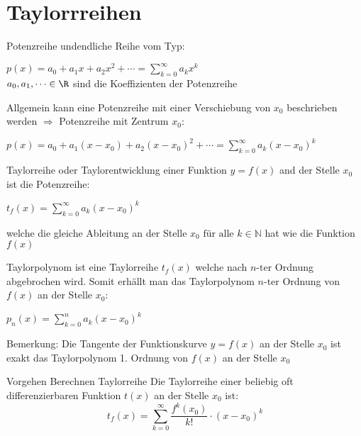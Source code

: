 \raggedcolumns


\section{Taylorrreihen}

\begin{definition}{Potenzreihe} undendliche Reihe vom Typ:
    \begin{center}
    $p(x)=a_0+a_1x+a_2x^2+ \cdots = \sum_{k=0}^{\infty}{a_kx^k} $\\
    \vspace{2mm}
    \(a_0,a_1, \cdots \in \R\) sind die Koeffizienten der Potenzreihe
    \end{center}
    Allgemein kann eine Potenzreihe mit einer Verschiebung von \(x_0\) beschrieben werden $\Rightarrow$ Potenzreihe mit Zentrum \(x_0\):
    \begin{center}
    $p(x)=a_0+a_1(x-x_0)+a_2(x-x_0)^2+\cdots = \sum_{k=0}^{\infty}{a_k(x-x_0)^k}$
    \end{center}
\end{definition}

\begin{definition}{Taylorreihe} oder Taylorentwicklung einer Funktion \(y=f(x)\) and der Stelle \(x_0\) ist die Potenzreihe:
  \begin{center}
    $t_f(x)=\sum_{k=0}^{\infty}{a_k(x-x_0)^k}$
  \end{center}
  welche die gleiche Ableitung an der Stelle \(x_0 \text{ für alle }k\in \mathbb{N}\) hat wie die Funktion \(f(x)\)
\end{definition}

\begin{definition}{Taylorpolynom}
  ist eine Taylorreihe \(t_f(x)\) welche nach \(n\text{-ter}\) Ordnung abgebrochen wird.
        Somit erhällt man das Taylorpolynom \(n\text{-ter}\) Ordnung von \(f(x)\) an der Stelle \(x_0\):
    \begin{center}
    $p_n(x)=\sum_{k=0}^{n}{a_k(x-x_0)^k}$
    \end{center}
    Bemerkung: Die Tangente der Funktionskurve \(y=f(x) \) an der Stelle \(x_0\) ist exakt das Taylorpolynom 1.
      Ordnung von \(f(x)\) an der Stelle \(x_0\)
\end{definition}

\begin{KR}{Vorgehen Berechnen Taylorreihe}
  Die Taylorreihe einer beliebig oft differenzierbaren Funktion \(t(x)\) an der Stelle \(x_0\) ist:
  \[t_f(x) = \sum_{k=0}^{\infty}{\frac{f^{k}(x_0)}{k!}\cdot(x-x_0)^k}\]
\end{KR}

